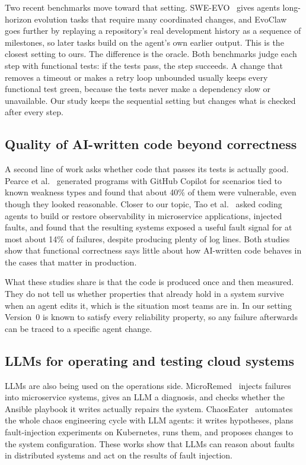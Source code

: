 \documentclass[sigconf,review]{acmart}
\begin{document}
Two recent benchmarks move toward that setting. SWE-EVO~\cite{le2025sweevo} gives agents
long-horizon evolution tasks that require many coordinated changes, and EvoClaw~\cite{deng2026evoclaw}
goes further by replaying a repository's real development history as a sequence of milestones, so
later tasks build on the agent's own earlier output. This is the closest setting to ours. The
difference is the oracle. Both benchmarks judge each step with functional tests: if the tests pass,
the step succeeds. A change that removes a timeout or makes a retry loop unbounded usually keeps
every functional test green, because the tests never make a dependency slow or unavailable. Our
study keeps the sequential setting but changes what is checked after every step.

\subsection{Quality of AI-written code beyond correctness}

A second line of work asks whether code that passes its tests is actually good. Pearce et
al.~\cite{pearce2022asleep} generated programs with GitHub Copilot for scenarios tied to known
weakness types and found that about 40\% of them were vulnerable, even though they looked
reasonable. Closer to our topic, Tao et al.~\cite{tao2026observability} asked coding agents to build
or restore observability in microservice applications, injected faults, and found that the
resulting systems exposed a useful fault signal for at most about 14\% of failures, despite
producing plenty of log lines. Both studies show that functional correctness says little about how
AI-written code behaves in the cases that matter in production.

What these studies share is that the code is produced once and then measured. They do not tell us
whether properties that already hold in a system survive when an agent edits it, which is the
situation most teams are in. In our setting Version~0 is known to satisfy every reliability
property, so any failure afterwards can be traced to a specific agent change.

\subsection{LLMs for operating and testing cloud systems}

LLMs are also being used on the operations side. MicroRemed~\cite{zhang2025microremed} injects
failures into microservice systems, gives an LLM a diagnosis, and checks whether the Ansible
playbook it writes actually repairs the system. ChaosEater~\cite{kikuta2025chaoseater} automates
the whole chaos engineering cycle with LLM agents: it writes hypotheses, plans fault-injection
experiments on Kubernetes, runs them, and proposes changes to the system configuration. These works
show that LLMs can reason about faults in distributed systems and act on the results of fault
injection.
\end{document}
